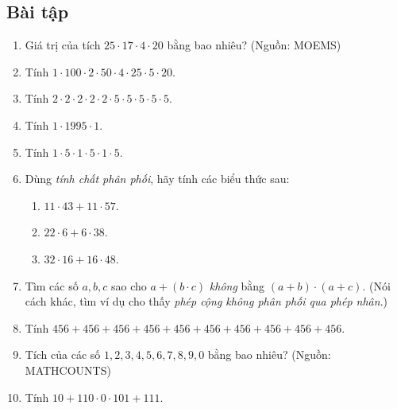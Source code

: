 \subsection*{Bài tập}

\begin{enumerate}[label=1.3.\arabic*.]
  \item Giá trị của tích \(25\cdot17\cdot4\cdot20\) bằng bao nhiêu?
        \hfill\small(Nguồn: MOEMS)
  \item Tính \(1\cdot100\cdot2\cdot50\cdot4\cdot25\cdot5\cdot20\).
  \item Tính \(2\cdot2\cdot2\cdot2\cdot2\cdot5\cdot5\cdot5\cdot5\cdot5\).
  \item Tính \(1\cdot1995\cdot1\).
  \item Tính \(1\cdot5\cdot1\cdot5\cdot1\cdot5\).
  \item Dùng \emph{tính chất phân phối}, hãy tính các biểu thức sau:
    \begin{enumerate}[label=(\alph*)]
      \item \(11\cdot43 + 11\cdot57\).
      \item \(22\cdot6 + 6\cdot38\).
      \item \(32\cdot16 + 16\cdot48\).
    \end{enumerate}
  \item Tìm các số \(a,b,c\) sao cho \(a+(b\cdot c)\) \emph{không} bằng
        \((a+b)\cdot(a+c)\).
        (Nói cách khác, tìm ví dụ cho thấy \emph{phép cộng không phân phối
        qua phép nhân}.)
  \item Tính \(456+456+456+456+456+456+456+456+456+456\).
  \item Tích của các số \(1,2,3,4,5,6,7,8,9,0\) bằng bao nhiêu?
        \hfill\small(Nguồn: MATHCOUNTS)
  \item Tính \(10+110\cdot0\cdot101+111\).
\end{enumerate}
